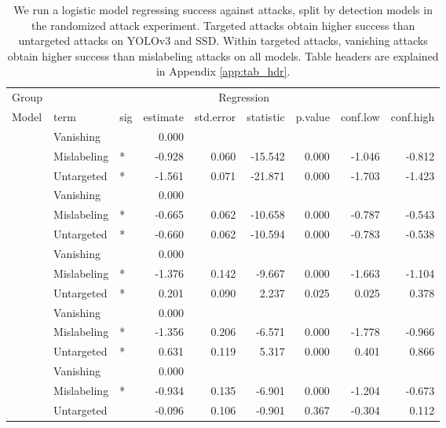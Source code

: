 \begingroup\fontsize{9}{11}\selectfont

\begin{longtable}[t]{lllrrrrrr}
\caption{\label{tab:target_untarget_vanish_mislabel_table}We run a logistic model regressing success against attacks, split by detection models in the randomized attack experiment. Targeted attacks obtain higher success than untargeted attacks on YOLOv3 and SSD. Within targeted attacks, vanishing attacks obtain higher success than mislabeling attacks on all models. Table headers are explained in Appendix \ref{app:tab_hdr}.}\\
\toprule
\multicolumn{1}{c}{Group} & \multicolumn{8}{c}{Regression} \\
\cmidrule(l{3pt}r{3pt}){1-1} \cmidrule(l{3pt}r{3pt}){2-9}
Model & term & sig & estimate & std.error & statistic & p.value & conf.low & conf.high\\
\midrule
 & Vanishing &  & 0.000 &  &  &  &  & \\
\cmidrule{2-9}\nopagebreak
 & Mislabeling & * & -0.928 & 0.060 & -15.542 & 0.000 & -1.046 & -0.812\\
\cmidrule{2-9}\nopagebreak
\multirow{-3}{*}{\raggedright\arraybackslash YOLOv3} & Untargeted & * & -1.561 & 0.071 & -21.871 & 0.000 & -1.703 & -1.423\\
\cmidrule{1-9}\pagebreak[0]
 & Vanishing &  & 0.000 &  &  &  &  & \\
\cmidrule{2-9}\nopagebreak
 & Mislabeling & * & -0.665 & 0.062 & -10.658 & 0.000 & -0.787 & -0.543\\
\cmidrule{2-9}\nopagebreak
\multirow{-3}{*}{\raggedright\arraybackslash SSD} & Untargeted & * & -0.660 & 0.062 & -10.594 & 0.000 & -0.783 & -0.538\\
\cmidrule{1-9}\pagebreak[0]
 & Vanishing &  & 0.000 &  &  &  &  & \\
\cmidrule{2-9}\nopagebreak
 & Mislabeling & * & -1.376 & 0.142 & -9.667 & 0.000 & -1.663 & -1.104\\
\cmidrule{2-9}\nopagebreak
\multirow{-3}{*}{\raggedright\arraybackslash RetinaNet} & Untargeted & * & 0.201 & 0.090 & 2.237 & 0.025 & 0.025 & 0.378\\
\cmidrule{1-9}\pagebreak[0]
 & Vanishing &  & 0.000 &  &  &  &  & \\
\cmidrule{2-9}\nopagebreak
 & Mislabeling & * & -1.356 & 0.206 & -6.571 & 0.000 & -1.778 & -0.966\\
\cmidrule{2-9}\nopagebreak
\multirow{-3}{*}{\raggedright\arraybackslash Faster R-CNN} & Untargeted & * & 0.631 & 0.119 & 5.317 & 0.000 & 0.401 & 0.866\\
\cmidrule{1-9}\pagebreak[0]
 & Vanishing &  & 0.000 &  &  &  &  & \\
\cmidrule{2-9}\nopagebreak
 & Mislabeling & * & -0.934 & 0.135 & -6.901 & 0.000 & -1.204 & -0.673\\
\cmidrule{2-9}\nopagebreak
\multirow{-3}{*}{\raggedright\arraybackslash Cascade R-CNN} & Untargeted &  & -0.096 & 0.106 & -0.901 & 0.367 & -0.304 & 0.112\\
\bottomrule
\end{longtable}
\endgroup{}

